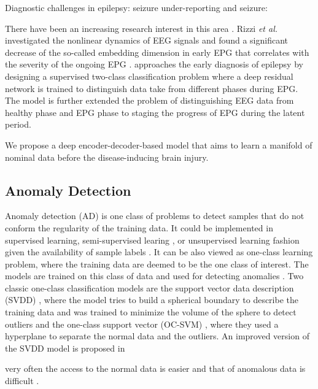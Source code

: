\documentclass[pmlr]{jmlr}%
\begin{document}
\cite{ELGER2018279} Diagnostic challenges in epilepsy: seizure under-reporting and seizure: 


There have been an increasing research interest in this area \cite{lu2020towards, lu2020staging, rizzi2019changes}. Rizzi \textit{et al.} investigated the nonlinear dynamics of EEG signals and found a significant decrease of the so-called embedding dimension in early EPG that correlates with the severity of the ongoing EPG \cite{rizzi2019changes}.
\cite{lu2020towards} approaches the early diagnosis of epilepsy by designing a supervised two-class classification problem where a deep residual network is trained to distinguish data take from different phases during EPG. The model is 
\cite{lu2020staging} further extended the problem of distinguishing EEG data from healthy phase and EPG phase to staging the progress of EPG during the latent period.

We propose a deep encoder-decoder-based model that aims to learn a manifold of nominal data before the disease-inducing brain injury.

\subsection{Anomaly Detection}
Anomaly detection (AD) is one class of problems to detect samples that do not conform the regularity of the training data. It could be implemented in supervised learning, semi-supervised learing \cite{ruff2019deep}, or unsupervised learning fashion \cite{} given the availability of sample labels \cite{NEURIPS2019_805163a0}. It can be also viewed as one-class learning problem, where the training data are deemed to be the one class of interest. The models are trained on this class of data and used for detecting anomalies \cite{shen2020timeseries,ruff2019self,ruff2018deep, scholkopf2001estimating, tax2004support}. Two classic one-class classification models are the support vector data description (SVDD) \cite{tax2004support}, where the model tries to build a spherical boundary to describe the training data and was trained to minimize the volume of the sphere to detect outliers and the one-class support vector (OC-SVM) \cite{scholkopf2001estimating}, where they used a hyperplane to separate the normal data and the outliers. An improved version of the SVDD model is proposed in

very often the access to the normal data is easier and that of anomalous data is difficult . 
\end{document}
